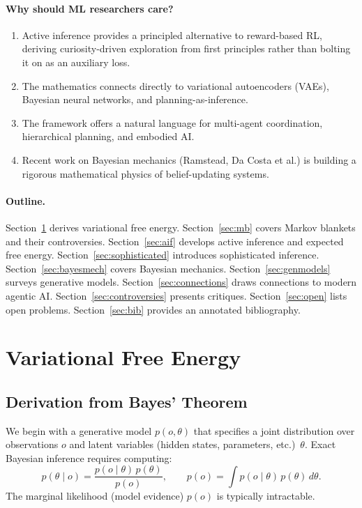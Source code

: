 \documentclass[11pt,a4paper]{article}
\theoremstyle{definition}
\begin{document}
\paragraph{Why should ML researchers care?}
\begin{enumerate}[leftmargin=2em]
  \item Active inference provides a principled alternative to reward-based RL,
    deriving curiosity-driven exploration from first principles rather than
    bolting it on as an auxiliary loss.
  \item The mathematics connects directly to variational autoencoders (VAEs),
    Bayesian neural networks, and planning-as-inference.
  \item The framework offers a natural language for multi-agent coordination,
    hierarchical planning, and embodied AI.
  \item Recent work on Bayesian mechanics (Ramstead, Da Costa et al.) is
    building a rigorous mathematical physics of belief-updating systems.
\end{enumerate}

\paragraph{Outline.}  Section~\ref{sec:vfe} derives variational free energy.
Section~\ref{sec:mb} covers Markov blankets and their controversies.
Section~\ref{sec:aif} develops active inference and expected free energy.
Section~\ref{sec:sophisticated} introduces sophisticated inference.
Section~\ref{sec:bayesmech} covers Bayesian mechanics.
Section~\ref{sec:genmodels} surveys generative models.
Section~\ref{sec:connections} draws connections to modern agentic AI.
Section~\ref{sec:controversies} presents critiques.
Section~\ref{sec:open} lists open problems.
Section~\ref{sec:bib} provides an annotated bibliography.


\section{Variational Free Energy}
\label{sec:vfe}

\subsection{Derivation from Bayes' Theorem}

We begin with a generative model $p(o, \theta)$ that specifies a joint
distribution over observations $o$ and latent variables (hidden states,
parameters, etc.)\ $\theta$.  Exact Bayesian inference requires computing:
\begin{equation}
  p(\theta \mid o) = \frac{p(o \mid \theta)\, p(\theta)}{p(o)},
  \qquad
  p(o) = \int p(o \mid \theta)\, p(\theta)\, d\theta.
  \label{eq:bayes}
\end{equation}
The marginal likelihood (model evidence) $p(o)$ is typically intractable.
\end{document}
